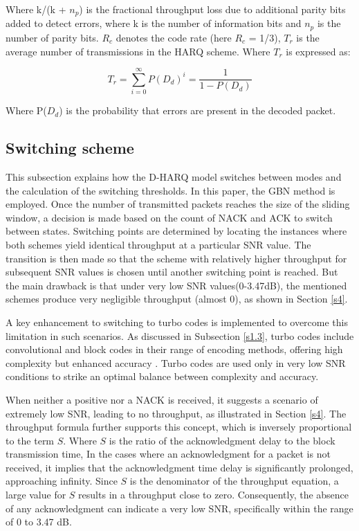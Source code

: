 \documentclass[sn-mathphys-num]{sn-jnl}
\theoremstyle{thmstyleone}
\theoremstyle{thmstyletwo}%
\theoremstyle{thmstylethree}%
\begin{document}
Where k/(k + ${n}_p$) is the fractional throughput loss due to additional parity bits added to detect errors, where k is the number of information bits and ${n}_p$ is the number of parity bits. ${R}_c$ denotes the code rate (here ${R}_c$ =  1/3),  ${T}_r$ is the average number of transmissions in the HARQ scheme. Where ${T}_r$ is expressed as: 

\begin{equation}
T_{r} = \sum_{i=0}^{\infty} P(D_{d})^{i} = \frac{1}{1 - P(D_{d})}
\end{equation} 

Where P(${D}_d$) is the probability that errors are present in the decoded packet. 

\subsection{Switching scheme} \label{s3.3}

This subsection explains how the D-HARQ model switches between modes and the calculation of the switching thresholds. In this paper, the GBN method is employed. Once the number of transmitted packets reaches the size of the sliding window, a decision is made based on the count of NACK and ACK to switch between states. Switching points are determined by locating the instances where both schemes yield identical throughput at a particular SNR value. The transition is then made so that the scheme with relatively higher throughput for subsequent SNR values is chosen until another switching point is reached. But the main drawback is that under very low SNR values(0-3.47dB), the mentioned schemes produce very negligible throughput (almost 0), as shown in Section \ref{s4}.

A key enhancement to switching to turbo codes is implemented to overcome this limitation in such scenarios. As discussed in Subsection \ref{s1.3}, turbo codes include convolutional and block codes in their range of encoding methods, offering high complexity but enhanced accuracy \cite{r25}. Turbo codes are used only in very low SNR conditions to strike an optimal balance between complexity and accuracy.

When neither a positive nor a NACK is received, it suggests a scenario of extremely low SNR, leading to no throughput, as illustrated in Section \ref{s4}. The throughput formula further supports this concept, which is inversely proportional to the term \(S\). Where \(S\) is the ratio of the acknowledgment delay to the block transmission time, In the cases where an acknowledgment for a packet is not received, it implies that the acknowledgment time delay is significantly prolonged, approaching infinity. Since \(S\) is the denominator of the throughput equation, a large value for \(S\) results in a throughput close to zero. Consequently, the absence of any acknowledgment can indicate a very low SNR, specifically within the range of 0 to 3.47 dB.
\end{document}
